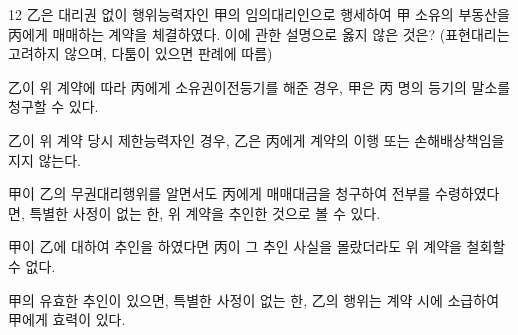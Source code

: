 \begin{question}{12}
乙은 대리권 없이 행위능력자인 甲의 임의대리인으로 행세하여 甲 소유의 부동산을 丙에게 매매하는 계약을 체결하였다. 이에 관한 설명으로 옳지 않은 것은? (표현대리는 고려하지 않으며, 다툼이 있으면 판례에 따름)
\begin{choices}
  \item 乙이 위 계약에 따라 丙에게 소유권이전등기를 해준 경우, 甲은 丙 명의 등기의 말소를 청구할 수 있다.
  \item 乙이 위 계약 당시 제한능력자인 경우, 乙은 丙에게 계약의 이행 또는 손해배상책임을 지지 않는다.
  \item 甲이 乙의 무권대리행위를 알면서도 丙에게 매매대금을 청구하여 전부를 수령하였다면, 특별한 사정이 없는 한, 위 계약을 추인한 것으로 볼 수 있다.
  \item 甲이 乙에 대하여 추인을 하였다면 丙이 그 추인 사실을 몰랐더라도 위 계약을 철회할 수 없다.
  \item 甲의 유효한 추인이 있으면, 특별한 사정이 없는 한, 乙의 행위는 계약 시에 소급하여 甲에게 효력이 있다.
\end{choices}
\end{question}
